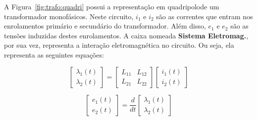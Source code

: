 \documentclass[a4paper]{article}
\theoremstyle{definition}
\theoremstyle{plain}
\begin{document}
A Figura~\ref{fig:trafo:quadri} possui a representação em quadripolo\footnotemark de um transformador monofásicos. Neste circuito, $i_1$ e $i_2$ são as correntes que entram nos enrolamentos primário e secundário do transformador. Além disso, $e_1$ e $e_2$ são as tensões induzidas destes enrolamentos. A caixa nomeada \textbf{Sistema Eletromag.}, por sua vez, representa a interação eletromagnética no circuito. Ou seja, ela representa as seguintes equações:

\begin{equation}
\begin{bmatrix}
\lambda_1(t)\\[5pt]
\lambda_2(t)
\end{bmatrix} =
\begin{bmatrix}
L_{11} & L_{12}\\[5pt]
L_{21} & L_{22}
\end{bmatrix}
\begin{bmatrix}
i_1(t)\\[5pt]
i_2(t)
\end{bmatrix}
\label{eq:lambda}
\end{equation} 


\begin{equation}
\begin{bmatrix}
e_1(t)\\[5pt]
e_2(t)
\end{bmatrix} =
\frac{d}{dt} 
\begin{bmatrix}
\lambda_1(t)\\[5pt]
\lambda_2(t)
\end{bmatrix}
\label{eq:e}
\end{equation}


\end{document}
